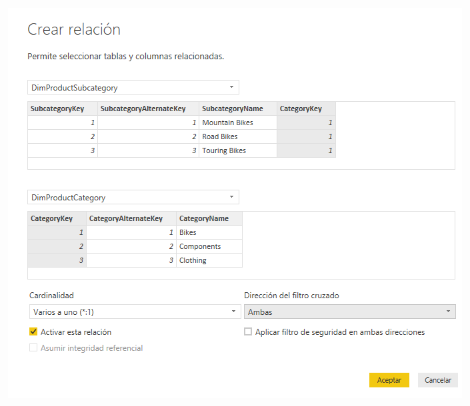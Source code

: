 \documentclass[12pt,letterpaper]{article}
\begin{document}
\begin{itemize}
\begin{center}
\end{center}
\begin{center}
\includegraphics[width=12cm]{./Imagenes/4}
\end{center}
\end{itemize}
\end{document}
